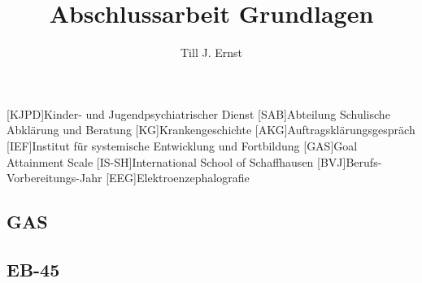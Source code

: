 


\title{Abschlussarbeit Grundlagen}
\author{Till J. Ernst}






\tableofcontents
\newpage

\begin{acronym}[KJPD]
[KJPD]{Kinder- und Jugendpsychiatrischer Dienst}
[SAB]{Abteilung Schulische Abklärung und Beratung}
[KG]{Krankengeschichte}
[AKG]{Auftragsklärungsgespräch}
[IEF]{Institut für systemische Entwicklung und Fortbildung}
[GAS]{Goal Attainment Scale}
[IS-SH]{International School of Schaffhausen}
[BVJ]{Berufs-Vorbereitungs-Jahr}
[EEG]{Elektroenzephalografie}
\end{acronym}
\newpage













\renewcommand{\appendixtocname}{Anhang}
\renewcommand{\appendixname}{Anhang}
\renewcommand{\appendixpagename}{Anhang}

\newpage
\appendixpage
\addappheadtotoc
\subsection{GAS}
\subsection{EB-45}


\newpage
\begin{flushleft}
{}
\end{flushleft}


%
%
%